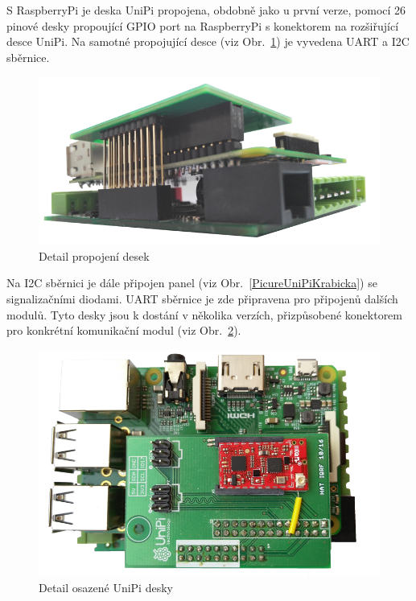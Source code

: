 S RaspberryPi je deska UniPi propojena, obdobně jako u první verze, pomocí 26 pinové desky propoující GPIO port na RaspberryPi s konektorem na rozšiřující desce UniPi. Na samotné propojující desce (viz Obr.~\ref{PicureUniPiConnectionImage}) je vyvedena UART a I2C sběrnice. 

 \begin{figure}[!ht]
  \begin{center}
    \includegraphics[scale=0.30]{obrazky/unipi_propojbrain}
  \end{center}
	\caption{Detail propojení desek}
	\label{PicureUniPiConnectionImage}
\end{figure}

Na I2C sběrnici je dále připojen panel (viz Obr.~\ref{PicureUniPiKrabicka}) se signalizačními diodami. UART sběrnice je zde připravena pro připojenů dalších modulů. Tyto desky jsou k dostání v několika verzích, přizpůsobené konektorem pro konkrétní komunikační modul (viz Obr.~\ref{PicureUniPiOsazena}).

 \begin{figure}[!ht]
  \begin{center}
    \includegraphics[scale=0.30]{obrazky/unipi_osazeny}
  \end{center}
	\caption{Detail osazené UniPi desky}
	\label{PicureUniPiOsazena}
\end{figure}

